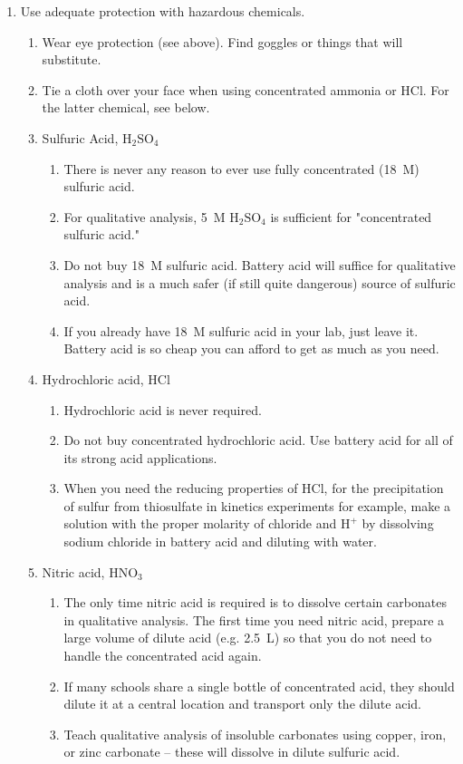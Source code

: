 \begin{enumerate}
\item{Use adequate protection with hazardous chemicals.}
\begin{enumerate}
\item{Wear eye protection (see above). 
Find goggles or things that will substitute.}
\item{Tie a cloth over your face when using concentrated ammonia or HCl. 
For the latter chemical, see below.}
\item{Sulfuric Acid, $\mbox{H}_{2}\mbox{SO}_{4}$}
\begin{enumerate}
\item{There is never any reason to ever use 
fully concentrated (18~M) sulfuric acid.}
\item{For qualitative analysis, 5~M $\mbox{H}_{2}\mbox{SO}_{4}$ 
is sufficient for "concentrated sulfuric acid."}
\item{Do not buy 18~M sulfuric acid. 
Battery acid will suffice for qualitative analysis 
and is a much safer (if still quite dangerous) source of sulfuric acid.}
\item{If you already have 18~M sulfuric acid in your lab, just leave it. 
Battery acid is so cheap you can afford to get as much as you need.}
\end{enumerate}
\item{Hydrochloric acid, HCl}
\begin{enumerate}
\item{Hydrochloric acid is never required.}
\item{Do not buy concentrated hydrochloric acid. 
Use battery acid for all of its strong acid applications.}
\item{When you need the reducing properties of HCl, 
for the precipitation of sulfur from thiosulfate 
in kinetics experiments for example, 
make a solution with the proper molarity of chloride and $\mbox{H}^{+}$ 
by dissolving sodium chloride in battery acid and diluting with water.}
\end{enumerate}
\item{Nitric acid, $\mbox{HNO}_{3}$}
\begin{enumerate}
\item{The only time nitric acid is required 
is to dissolve certain carbonates in qualitative analysis. 
The first time you need nitric acid, 
prepare a large volume of dilute acid (e.g. 2.5~L) 
so that you do not need to handle the concentrated acid again.}
\item{If many schools share a single bottle of concentrated acid, 
they should dilute it at a central location and transport only the dilute acid.}
\item{Teach qualitative analysis of insoluble carbonates 
using copper, iron, or zinc carbonate -- 
these will dissolve in dilute sulfuric acid.}
\end{enumerate}
\end{enumerate}


\end{enumerate}
